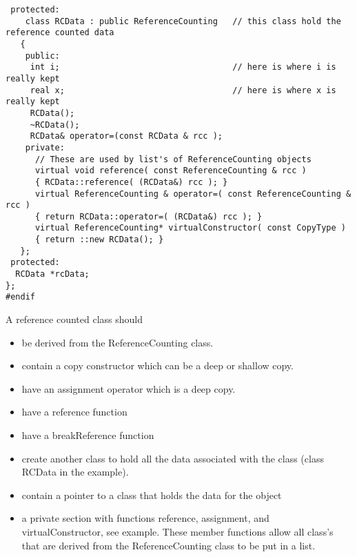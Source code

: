 {\begin{verbatim}
 protected:
    class RCData : public ReferenceCounting   // this class hold the reference counted data
   {
    public:
     int i;                                   // here is where i is really kept
     real x;                                  // here is where x is really kept
     RCData(); 
     ~RCData();
     RCData& operator=(const RCData & rcc );
    private:
      // These are used by list's of ReferenceCounting objects
      virtual void reference( const ReferenceCounting & rcc )
      { RCData::reference( (RCData&) rcc ); }
      virtual ReferenceCounting & operator=( const ReferenceCounting & rcc )
      { return RCData::operator=( (RCData&) rcc ); }
      virtual ReferenceCounting* virtualConstructor( const CopyType )
      { return ::new RCData(); }  
   };
 protected:
  RCData *rcData;
};  
#endif 
\end{verbatim}
}

A reference counted class should 
\begin{itemize}
 \item be derived from the {\ff ReferenceCounting} class.
 \item contain a copy constructor which can be a deep or shallow copy.
 \item have an assignment operator which is a deep copy.
 \item have a {\ff reference} function
 \item have a {\ff breakReference} function
 \item create another class to hold all the data associated with the class
       (class RCData in the example).
 \item contain a pointer to a class that holds the data for the object
 \item a private section with functions {\ff reference}, assignment,
       and {\ff virtualConstructor}, see example. These member functions
       allow all class's that are derived from the {\ff ReferenceCounting}
       class to be put in a list.
\end{itemize}

